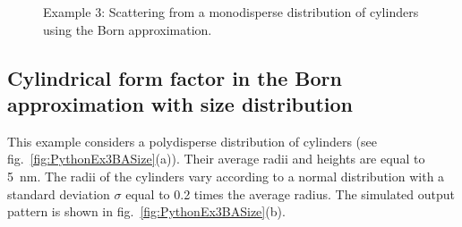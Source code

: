 \begin{figure}[H]
\hfill
{}
\hfill
{}
\hfill
\caption{Example 3: Scattering from a monodisperse distribution of cylinders using the Born approximation.}
\label{fig:PythonEx3BA}
\end{figure}

\subsection{Cylindrical form factor in the Born approximation with size distribution}
This example considers a polydisperse distribution of cylinders (see fig.~\ref{fig:PythonEx3BASize}(a)). Their average radii and heights are equal to 5~nm. The radii of the cylinders vary according to a normal distribution with a standard deviation $\sigma$ equal to 0.2 times the average radius. The simulated output pattern is shown in fig.~\ref{fig:PythonEx3BASize}(b).

